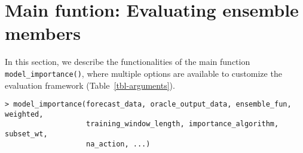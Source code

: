 \documentclass[
  article,
  shortnames,
  notitle]{jss}
\begin{document}
\section{Main funtion: Evaluating ensemble
members}\label{sec:main-function}

In this section, we describe the functionalities of the main function
\texttt{model\_importance()}, where multiple options are available to
customize the evaluation framework (Table~\ref{tbl-arguments}).

\begin{verbatim}
> model_importance(forecast_data, oracle_output_data, ensemble_fun, weighted,
                   training_window_length, importance_algorithm, subset_wt, 
                   na_action, ...)
\end{verbatim}
\end{document}
